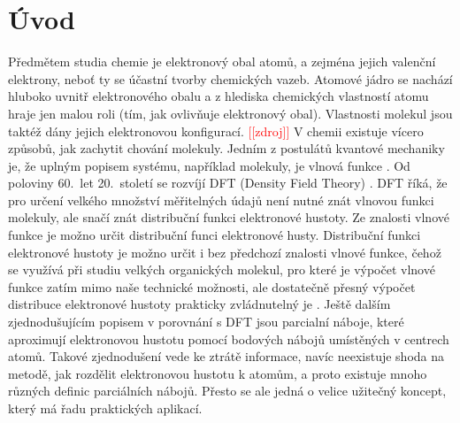 \documentclass[
  color, %
  table, %
  lof,   %
  lot,   %
]{fithesis3}
\newcommand\fixme[1]{\textcolor{red}{[[#1]]}}
\begin{document}






% 



\chapter*{Úvod}

Předmětem studia chemie je elektronový obal atomů, a zejména jejich valenční elektrony, neboť ty se účastní tvorby chemických vazeb. Atomové jádro se nachází hluboko uvnitř elektronového obalu a z hlediska chemických vlastností atomu hraje jen malou roli (tím, jak ovlivňuje elektronový obal). Vlastnosti molekul jsou taktéž dány jejich elektronovou konfigurací. \fixme{zdroj} V chemii existuje vícero způsobů, jak zachytit chování molekuly. Jedním z postulátů kvantové mechaniky je, že uplným popisem systému, například molekuly, je vlnová funkce \citep[s.~4]{cramer2004essentials}. Od poloviny 60.~let 20.~století se rozvíjí DFT (Density Field Theory) \citep[s.~252]{cramer2004essentials}. DFT říká, že pro určení velkého množství měřitelných údajů není nutné znát vlnovou funkci molekuly, ale snačí znát distribuční funkci elektronové hustoty. Ze znalosti vlnové funkce je možno určit distribuční funci elektronové husty. Distribuční funkci elektronové hustoty je možno určit i bez předchozí znalosti vlnové funkce, čehož se využívá při studiu velkých organických molekul, pro které je výpočet vlnové funkce zatím mimo naše technické možnosti, ale dostatečně přesný výpočet distribuce elektronové hustoty prakticky zvládnutelný je \citep[s.~260]{cramer2004essentials}. Ještě dalším zjednodušujícím popisem v porovnání s DFT jsou parcialní náboje, které aproximují elektronovou hustotu pomocí bodových nábojů umístěných v centrech atomů. Takové zjednodušení vede ke ztrátě informace, navíc neexistuje shoda na metodě, jak rozdělit elektronovou hustotu k atomům, a proto existuje mnoho různých definic parciálních nábojů. Přesto se ale jedná o velice užitečný koncept, který má řadu praktických aplikací.
\end{document}

